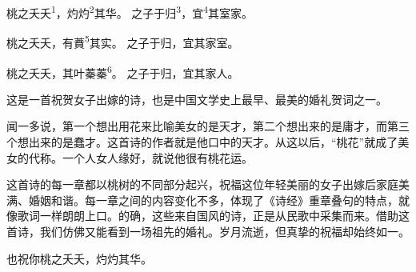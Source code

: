 
\begin{poem}
桃之夭夭\textsuperscript{1}，灼灼\textsuperscript{2}其华。
之子于归\textsuperscript{3}，宜\textsuperscript{4}其室家。

桃之夭夭，有蕡\textsuperscript{5}其实。
之子于归，宜其家室。

桃之夭夭，其叶蓁蓁\textsuperscript{6}。
之子于归，宜其家人。
\end{poem}

\begin{annotations}
\end{annotations}

\begin{appreciation}
这是一首祝贺女子出嫁的诗，也是中国文学史上最早、最美的婚礼贺词之一。

闻一多说，第一个想出用花来比喻美女的是天才，第二个想出来的是庸才，而第三个想出来的是蠢才。这首诗的作者就是他口中的天才。从这以后，“桃花”就成了美女的代称。一个人女人缘好，就说他很有桃花运。

这首诗的每一章都以桃树的不同部分起兴，祝福这位年轻美丽的女子出嫁后家庭美满、婚姻和谐。每一章之间的内容变化不多，体现了《诗经》重章叠句的特点，就像歌词一样朗朗上口。的确，这些来自国风的诗，正是从民歌中采集而来。借助这首诗，我们仿佛又能看到一场祖先的婚礼。岁月流逝，但真挚的祝福却始终如一。

也祝你桃之夭夭，灼灼其华。
\end{appreciation}
